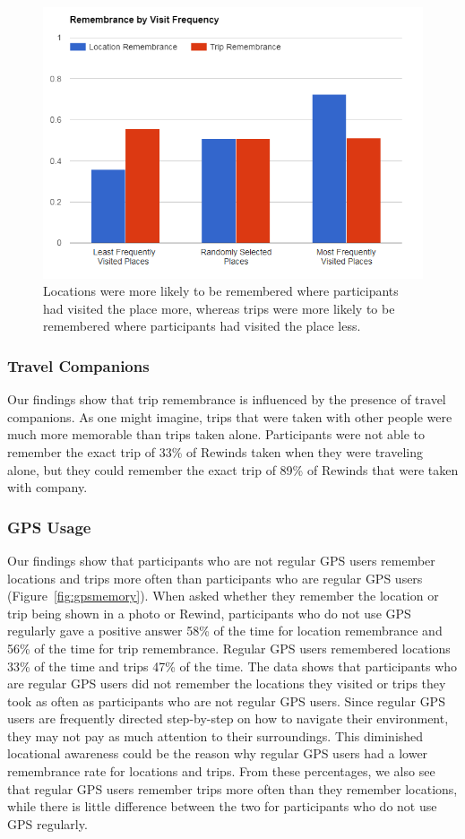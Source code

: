 \documentclass{sigchi}
\begin{document}
\begin{figure}
   \centering
     \includegraphics[width=1\linewidth]{RML_2}
     \caption{Locations were more likely to be remembered where participants had visited the place more, whereas trips were more likely to be remembered where participants had visited the place less.}
     \label{fig:frequencymemory}
\end{figure}

\subsubsection{Travel Companions}
Our findings show that trip remembrance is influenced by the presence of travel companions. As one might imagine, trips that were taken with other people were much more memorable than trips taken alone. Participants were not able to remember the exact trip of 33\% of Rewinds taken when they were traveling alone, but they could remember the exact trip of 89\% of Rewinds that were taken with company.

\subsubsection{GPS Usage}
Our findings show that participants who are not regular GPS users remember locations and trips more often than participants who are regular GPS users (Figure~\ref{fig:gpsmemory}). When asked whether they remember the location or trip being shown in a photo or Rewind, participants who do not use GPS regularly gave a positive answer 58\% of the time for location remembrance and 56\% of the time for trip remembrance. Regular GPS users remembered locations 33\% of the time and trips 47\% of the time. The data shows that participants who are regular GPS users did not remember the locations they visited or trips they took as often as participants who are not regular GPS users. Since regular GPS users are frequently directed step-by-step on how to navigate their environment, they may not pay as much attention to their surroundings. This diminished locational awareness could be the reason why regular GPS users had a lower remembrance rate for locations and trips. From these percentages, we also see that regular GPS users remember trips more often than they remember locations, while there is little difference between the two for participants who do not use GPS regularly. 
\end{document}
